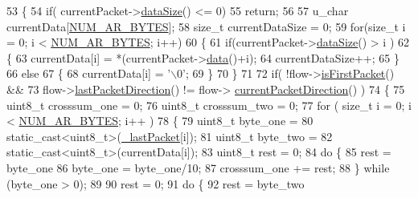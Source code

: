 \begin{DoxyCode}
53 \{   
54     \textcolor{keywordflow}{if}( currentPacket->\hyperlink{class_vsid_common_1_1_i_pv4_packet_a39fe36210895625ee87320f5c0c7f52e}{dataSize}() <= 0)
55         \textcolor{keywordflow}{return};
56 
57     u\_char currentData[\hyperlink{_action_reaction_first3_byte_hash_meter_8h_aea59a8fee574d94507bd2fd64f06acf6}{NUM\_AR\_BYTES}];
58     \textcolor{keywordtype}{size\_t} currentDataSize = 0;
59     \textcolor{keywordflow}{for}(\textcolor{keywordtype}{size\_t} i = 0; i < \hyperlink{_action_reaction_first3_byte_hash_meter_8h_aea59a8fee574d94507bd2fd64f06acf6}{NUM\_AR\_BYTES}; i++)
60     \{
61         \textcolor{keywordflow}{if}(currentPacket->\hyperlink{class_vsid_common_1_1_i_pv4_packet_a39fe36210895625ee87320f5c0c7f52e}{dataSize}() > i )
62         \{
63             currentData[i] = *(currentPacket->\hyperlink{class_vsid_common_1_1_i_pv4_packet_a9fb8c763d740e193a68c55604a8a7bd6}{data}()+i);
64             currentDataSize++;
65         \}
66         \textcolor{keywordflow}{else}
67         \{
68             currentData[i] = \textcolor{charliteral}{'\(\backslash\)0'};
69         \}
70     \}
71 
72     \textcolor{keywordflow}{if}( !flow->\hyperlink{class_vsid_common_1_1_flow_ae437ae88fb48d6ac2880f40fc88195da}{isFirstPacket}() && 
73             flow->\hyperlink{class_vsid_common_1_1_flow_a3a2a19ce10910e74f43a196ab65f6cd9}{lastPacketDirection}() != flow->
      \hyperlink{class_vsid_common_1_1_flow_a0eb1c59e966ceb9ad6fee05d4c4784ad}{currentPacketDirection}() )
74     \{
75         uint8\_t crosssum\_one = 0;
76         uint8\_t crosssum\_two = 0;
77         \textcolor{keywordflow}{for} ( \textcolor{keywordtype}{size\_t} i = 0; i < \hyperlink{_action_reaction_first3_byte_hash_meter_8h_aea59a8fee574d94507bd2fd64f06acf6}{NUM\_AR\_BYTES}; i++ )
78         \{
79             uint8\_t byte\_one =
80                     \textcolor{keyword}{static\_cast<}uint8\_t\textcolor{keyword}{>}(\hyperlink{class_vsid_1_1_action_reaction_first3_byte_hash_meter_af21e55c2278704e0741e51829cfbee46}{\_lastPacket}[i]);
81             uint8\_t byte\_two =
82                 \textcolor{keyword}{static\_cast<}uint8\_t\textcolor{keyword}{>}(currentData[i]);
83             uint8\_t rest = 0;
84             \textcolor{keywordflow}{do} \{
85                 rest = byte\_one%
86                 byte\_one = byte\_one/10;
87                 crosssum\_one += rest;
88             \} \textcolor{keywordflow}{while} (byte\_one > 0);
89 
90             rest = 0;
91             \textcolor{keywordflow}{do} \{
92                 rest = byte\_two%

\end{DoxyCode}
